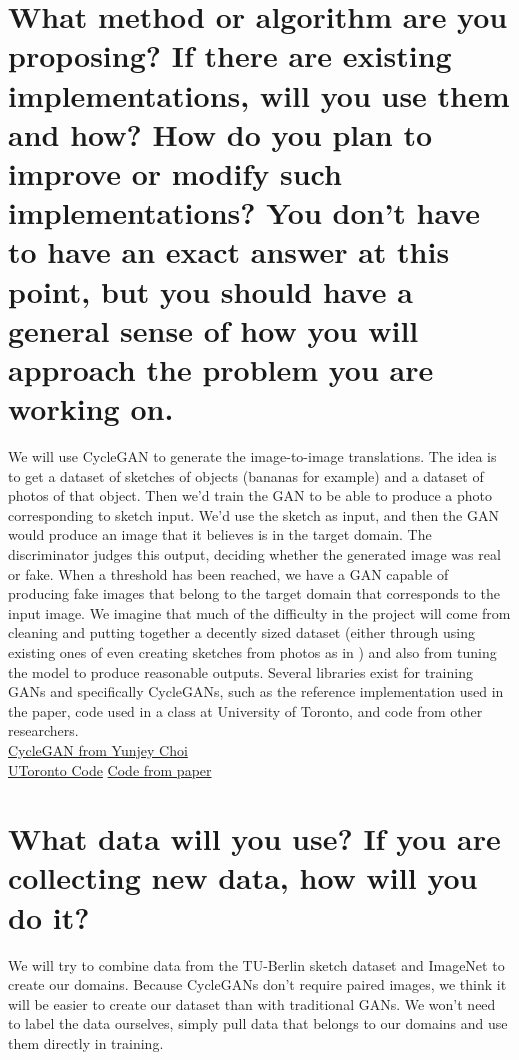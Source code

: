 \documentclass{article}
\begin{document}
\section{What method or algorithm are you proposing? If there are existing implementations, will you use them and how? How do you plan to improve or modify such implementations? You don't have to have an exact answer at this point, but you should have a general sense of how you will approach the problem you are working on. }

We will use CycleGAN to generate the image-to-image translations.
The idea is to get a dataset of sketches of objects (bananas for example) and a dataset of photos of that object.
Then we'd train the GAN to be able to produce a photo corresponding to sketch input. 
We'd use the sketch as input, and then the GAN would produce an image that it believes is in the target domain. 
The discriminator judges this output, deciding whether the generated image was real or fake.
When a threshold has been reached, we have a GAN capable of producing fake images that belong to the target domain that corresponds to the input image.
We imagine that much of the difficulty in the project will come from cleaning and putting together a decently sized dataset (either through using existing ones of even creating sketches from photos as in \cite{pix2pix}) and also from tuning the model to produce reasonable outputs.
Several libraries exist for training GANs and specifically CycleGANs, such as the reference implementation used in the paper, code used in a class at University of Toronto, and code from other researchers. \\
\href{https://github.com/yunjey/mnist-svhn-transfer}{CycleGAN from Yunjey Choi} \\
\href{www.cs.toronto.edu/~rgrosse/courses/csc321_2018/assignments/a4-code.zip}{UToronto Code}
\href{https://github.com/junyanz/pytorch-CycleGAN-and-pix2pix}{Code from paper}

\section{What data will you use? If you are collecting new data, how will you do it?}

We will try to combine data from the TU-Berlin sketch dataset \cite{tu-berlin-sketch} and ImageNet \cite{imagenet} to create our domains. 
Because CycleGANs don't require paired images, we think it will be easier to create our dataset than with traditional GANs.
We won't need to label the data ourselves, simply pull data that belongs to our domains and use them directly in training.
\end{document}
